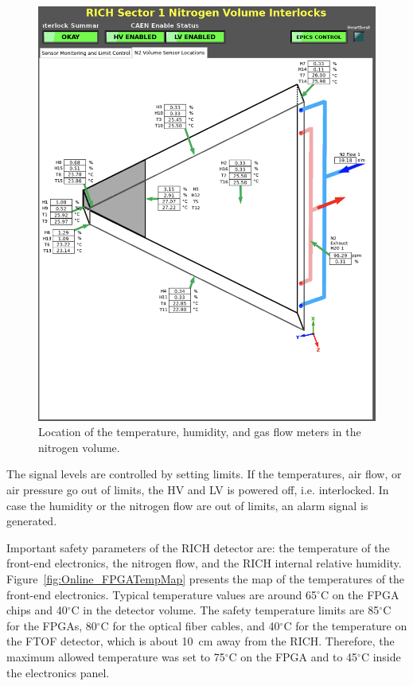 \documentclass[5p,times,twocolumn]{elsarticle}
\begin{document}
\begin{figure}
\begin{center}
\includegraphics[width=0.7\columnwidth]{RICH_sensors_nitrogen.png}
\end{center}
\caption{Location of the temperature, humidity, and gas flow meters in the nitrogen volume.}
\label{Fig:RICH_sensors_nitrogen}
\end{figure}

The signal levels are controlled by setting limits.  If the temperatures, air flow, or air pressure go out of limits, the
HV and LV is powered off, i.e. interlocked. In case the humidity or the nitrogen flow are out of limits, an alarm signal
is generated.

Important safety parameters of the RICH detector are: the temperature of the front-end electronics, the nitrogen
flow, and the RICH internal relative humidity. Figure~\ref{fig:Online_FPGATempMap} presents the map of the
temperatures of the front-end electronics.
Typical temperature values are around 65$^\circ$C on the FPGA chips and 40$^\circ$C in the detector volume.
The safety temperature limits are 85$^\circ$C for the FPGAs, 80$^\circ$C for the optical fiber cables, and 40$^\circ$C
for the temperature on the FTOF detector, which is about 10~cm away from the RICH. Therefore, the maximum
allowed temperature was set to 75$^\circ$C on the FPGA and to 45$^\circ$C inside the electronics panel.
\end{document}
